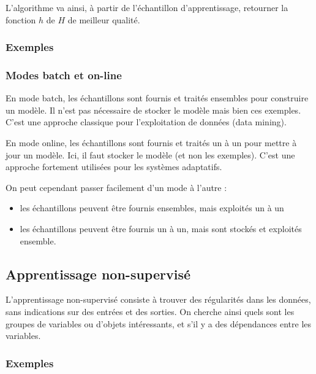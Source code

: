 		L'algorithme va ainsi, à partir de l'échantillon d'apprentissage, retourner la fonction $h$ de $H$ de meilleur qualité.
		
			\subsubsection{Exemples}
			
			
			\subsubsection{Modes batch et on-line}
		
			En mode batch, les échantillons sont fournis et traités ensembles pour construire un modèle. Il n'est pas nécessaire de stocker le modèle mais bien ces exemples. C'est une approche classique pour l'exploitation de données (data mining).
			
		En mode online, les échantillons sont fournis et traités un à un pour mettre à jour un modèle. Ici, il faut stocker le modèle (et non les exemples). C'est une approche fortement utilisées pour les systèmes adaptatifs.
		
			On peut cependant passer facilement d'un mode à l'autre :
		
			\begin{itemize}
				\item les échantillons peuvent être fournis ensembles, mais exploités un à un
				\item les échantillons peuvent être fournis un à un, mais sont stockés et exploités ensemble.
			\end{itemize}
		
		\subsection{Apprentissage non-supervisé}
		
		L'apprentissage non-supervisé consiste à trouver des régularités dans les données, sans indications sur des entrées et des sorties. On cherche ainsi quels sont les groupes de variables ou d'objets intéressants, et s'il y a des dépendances entre les variables.
		
			\subsubsection{Exemples}
			
		
